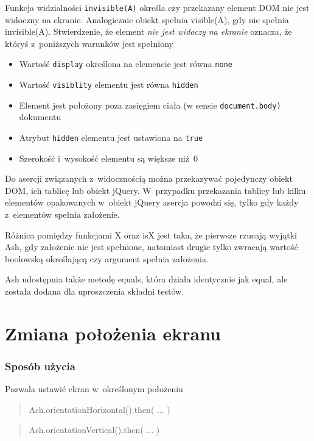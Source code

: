 \documentclass[brudnopis]{xmgr}
\begin{document}
Funkcja widzialności \texttt{invisible(A)} określa czy przekazany element DOM nie jest widoczny na ekranie. Analogicznie obiekt spełnia visible(A), gdy nie spełnia invisible(A). Stwierdzenie, że element {\it nie jest widoczy na ekranie} oznacza, że któryś z~poniższych warunków jest spełniony

\begin{itemize}
  \item Wartość \texttt{display} określona na elemencie jest równa \texttt{none}
  \item Wartość \texttt{visiblity} elementu jest równa \texttt{hidden}
  \item Element jest położony poza zasięgiem ciała (w sensie \texttt{document.body)} dokumentu
  \item Atrybut \texttt{hidden} elementu jest ustawiona na \texttt{true}
  \item Szerokość i~wysokość elementu są większe niż~0
\end{itemize}

Do asercji związanych z~widocznością można przekazywać pojedynczy obiekt DOM, ich tablicę lub obiekt jQuery. W~przypadku przekazania tablicy lub kilku elementów opakowanych w~obiekt jQuery asercja powodzi się, tylko gdy każdy z~elementów spełnia założenie. 

Różnica pomiędzy funkcjami X oraz isX jest taka, że pierwsze rzucają wyjątki Ash, gdy założenie nie jest spełnione, natomiast drugie tylko zwracają wartość boolowską określającą czy argument spełnia założenia.  

Ash udostępnia także metodę equals, która działa identycznie jak equal, ale została dodana dla uproszczenia składni testów.

\section{Zmiana położenia ekranu}

\subsubsection{Sposób użycia}
Pozwala ustawić ekran w~określonym położeniu

\begin{quote}
Ash.orientationHorizontal().then( ... ) 
\end{quote}

\begin{quote}
Ash.orientationVertical().then( ... ) 
\end{quote}
\end{document}
